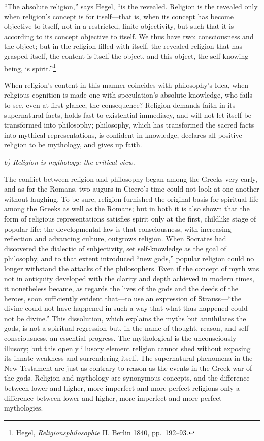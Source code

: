 \documentclass[12pt,a4paper]{article}
\begin{document}
``The absolute religion,'' says Hegel, ``is the revealed. Religion
is the revealed only when religion's concept is for itself---that
is, when its concept has become objective to itself, not in a
restricted, finite objectivity, but such that it is according to
its concept objective to itself. We thus have two: consciousness
and the object; but in the religion filled with itself, the
revealed religion that has grasped itself, the content is itself
the object, and this object, the self-knowing being, is
spirit.''\footnote{Hegel, \textit{Religionsphilosophie} II.
Berlin 1840, pp.\ 192--93.}

When religion's content in this manner coincides with
philosophy's Idea, when religious cognition is made one with
speculation's absolute knowledge, who fails to see, even at
first glance, the consequence? Religion demands faith in its
supernatural facts, holds fast to existential immediacy, and
will not let itself be transformed into philosophy; philosophy,
which has transformed the sacred facts into mythical
representations, is confident in knowledge, declares all
positive religion to be mythology, and gives up faith.

\medskip

\noindent\textit{b) Religion is mythology: the critical view.}

\medskip

The conflict between religion and philosophy began among the
Greeks very early, and as for the Romans, two augurs in Cicero's
time could not look at one another without laughing. To be sure,
religion furnished the original basis for spiritual life among
the Greeks as well as the Romans; but in both it is also shown
that the form of religious representations satisfies spirit only
at the first, childlike stage of popular life: the developmental
law is that consciousness, with increasing reflection and
advancing culture, outgrows religion. When Socrates had
discovered the dialectic of subjectivity, set self-knowledge as
the goal of philosophy, and to that extent introduced ``new
gods,'' popular religion could no longer withstand the attacks
of the philosophers. Even if the concept of myth was not in
antiquity developed with the clarity and depth achieved in
modern times, it nonetheless became, as regards the lives of the
gods and the deeds of the heroes, soon sufficiently evident
that---to use an expression of Strauss---``the divine could not
have happened in such a way that what thus happened could not
be divine.'' This dissolution, which explains the myths but
annihilates the gods, is not a spiritual regression but, in the
name of thought, reason, and self-consciousness, an essential
progress. The mythological is the unconsciously illusory; but
this openly illusory element religion cannot shed without
exposing its innate weakness and surrendering itself. The
supernatural phenomena in the New Testament are just as contrary
to reason as the events in the Greek war of the gods. Religion
and mythology are synonymous concepts, and the difference
between lower and higher, more imperfect and more perfect
religions only a difference between lower and higher, more
imperfect and more perfect mythologies.
\end{document}

